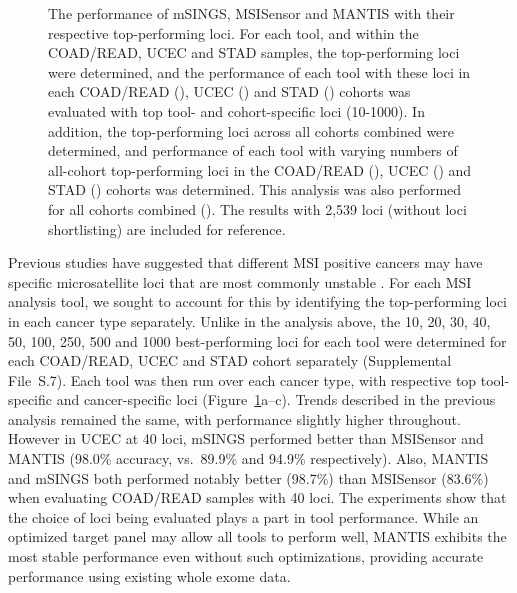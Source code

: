 \begin{figure}[p]
	\caption[Performance of mSINGS, MSISensor and MANTIS with their respective top-performing loci.]{The performance of mSINGS, MSISensor and MANTIS with their respective top-performing loci. For each tool, and within the COAD/READ, UCEC and STAD samples, the top-performing loci were determined, and the performance of each tool with these loci in each COAD/READ (), UCEC () and STAD () cohorts was evaluated with top tool- and cohort-specific loci (10-1000). In addition, the top-performing loci across all cohorts combined were determined, and performance of each tool with varying numbers of all-cohort top-performing loci in the COAD/READ (), UCEC () and STAD () cohorts was determined. This analysis was also performed for all cohorts combined (). The results with 2,539 loci (without loci shortlisting) are included for reference.}
	\label{fig:msilandscape:tool_performance_top_loci}
\end{figure}

Previous studies have suggested that different MSI positive cancers may have specific microsatellite loci that are most commonly unstable \cite{faulkner2004,hempelmann2015}. For each MSI analysis tool, we sought to account for this by identifying the top-performing loci in each cancer type separately. Unlike in the analysis above, the 10, 20, 30, 40, 50, 100, 250, 500 and 1000 best-performing loci for each tool were determined for each COAD/READ, UCEC and STAD cohort separately (Supplemental File~S\thechapter{}.7). Each tool was then run over each cancer type, with respective top tool-specific and cancer-specific loci (Figure~\ref{fig:msilandscape:tool_performance_top_loci}a--c). Trends described in the previous analysis remained the same, with performance slightly higher throughout. However in UCEC at 40 loci, mSINGS performed better than MSISensor and MANTIS (98.0\% accuracy, vs.\ 89.9\% and 94.9\% respectively). Also, MANTIS and mSINGS both performed notably better (98.7\%) than MSISensor (83.6\%) when evaluating COAD/READ samples with 40 loci. The experiments show that the choice of loci being evaluated plays a part in tool performance. While an optimized target panel may allow all tools to perform well, MANTIS exhibits the most stable performance even without such optimizations, providing accurate performance using existing whole exome data.

